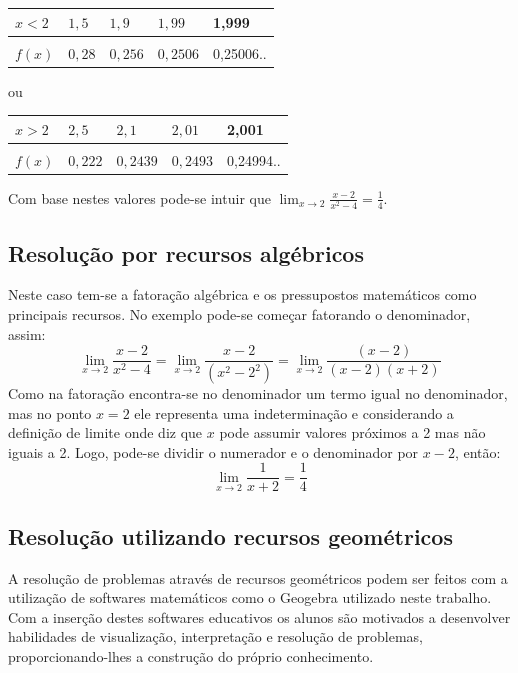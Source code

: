 \begin{table}[H]
\centering
\label{tab:tabintuit}
\smallskip
\begin{tabular}{l|l|l|l|l}
 $x<2$ & $1,5$ & $1,9$ & $ 1,99$ & 1,999 \\[0.5ex]
\hline
&&&\\[-2ex]
$f(x)$ & $0,28$ &  $0,256$ &  $0,2506$ & 0,25006..\\[0.5ex]
\end{tabular}
\end{table}
ou
\begin{table}[H]
\centering
\label{tab:tabintuit}
\smallskip
\begin{tabular}{l|l|l|l|l}
 $x>2$ & $2,5$ & $2,1$ & $2,01$ &  2,001 \\[0.5ex]
\hline
&&&\\[-2ex]
$f(x)$ & $0,222$ &  $0,2439$ &  $0,2493$ & 0,24994..\\[0.5ex]
\end{tabular}
\end{table}

Com base nestes valores pode-se intuir que $\displaystyle \lim_{x \to 2} \frac{x-2}{x^2-4} = \frac{1}{4}$.

\subsection{Resolução por recursos algébricos}
Neste caso tem-se a fatoração algébrica e os pressupostos matemáticos como principais recursos. No exemplo pode-se começar fatorando o denominador, assim:
$$
\lim_{x \to 2} \frac{x-2}{x^2-4} = \lim_{x \to 2} \frac{x-2}{(x^2 - 2^2)} = \lim_{x \to 2} \frac{(x-2)}{(x-2)(x+2)}
$$
\qquad Como  na fatoração encontra-se no denominador um termo igual  no denominador, mas no ponto $x=2$ ele representa uma indeterminação e considerando a definição de limite onde diz que $x$ pode assumir valores próximos a 2 mas não iguais a 2. Logo, pode-se dividir o numerador e o denominador por $x-2$, então:
$$
\lim_{x \to 2} \frac{1}{x+2} = \frac{1}{4}
$$

\subsection{Resolução utilizando recursos geométricos}
A resolução de problemas através de recursos geométricos podem ser feitos com a utilização de softwares matemáticos como o Geogebra utilizado neste trabalho. Com a inserção destes softwares educativos os alunos são motivados a desenvolver habilidades de visualização, interpretação e resolução de problemas, proporcionando-lhes a construção do próprio conhecimento.

